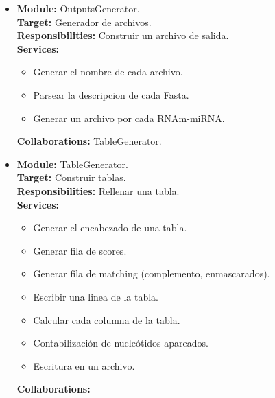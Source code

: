 \documentclass[12pt,a4paper]{article}
\begin{document}
\begin{itemize}
    \item \textbf{Module:} OutputsGenerator. \\
    \textbf{Target:} Generador de archivos. \\
    \textbf{Responsibilities:} Construir un archivo de salida. \\
    \textbf{Services:}
        \begin{itemize}
            \item Generar el nombre de cada archivo.
            \item Parsear la descripcion de cada Fasta.
            \item Generar un archivo por cada RNAm-miRNA.
        \end{itemize} 
    \textbf{Collaborations:}	TableGenerator. \\

    \item \textbf{Module:} TableGenerator. \\
    \textbf{Target:} Construir tablas. \\
    \textbf{Responsibilities:} Rellenar una tabla. \\
    \textbf{Services:}
        \begin{itemize}
            \item Generar el encabezado de una tabla.
            \item Generar fila de scores.
            \item Generar fila de matching (complemento, enmascarados).
            \item Escribir una linea de la tabla.
            \item Calcular cada columna de la tabla.
            \item Contabilización de nucleótidos apareados.
            \item Escritura en un archivo.
        \end{itemize} 
    \textbf{Collaborations:} - \\
\end{itemize}
\end{document}
